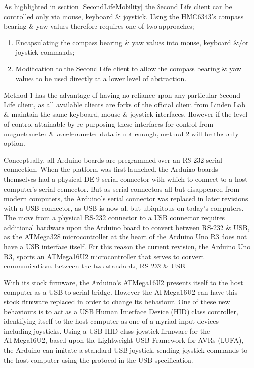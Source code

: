 As highlighted in section \ref{SecondLifeMobility} the Second Life client can be controlled only via mouse, keyboard \& joystick. Using the HMC6343's compass bearing \& yaw values therefore requires one of two approaches;

\begin{enumerate}
	\item Encapsulating the compass bearing \& yaw values into mouse, keyboard \&/or joystick commands;
	\item Modification to the Second Life client to allow the compass bearing \& yaw values to be used directly at a lower level of abstraction.
\end{enumerate}

Method 1 has the advantage of having no reliance upon any particular Second Life client, as all available clients are forks of the official client from Linden Lab \& maintain the same keyboard, mouse \& joystick interfaces. However if the level of control attainable by re-purposing these interfaces for control from magnetometer \& accelerometer data is not enough, method 2 will be the only option.

Conceptually, all Arduino boards are programmed over an RS-232 serial connection. When the platform was first launched, the Arduino boards themselves had a physical DE-9 serial connector with which to connect to a host computer's serial connector. But as serial connectors all but disappeared from modern computers, the Arduino's serial connector was replaced in later revisions with a USB connector, as USB is now all but ubiquitous on today's computers. The move from a physical RS-232 connector to a USB connector requires additional hardware upon the Arduino board to convert between RS-232 \& USB, as the ATMega328\atmegaTFootnote{} microcontroller at the heart of the Arduino Uno R3 does not have a USB interface itself. For this reason the current revision, the Arduino Uno R3, sports an ATMega16U2\atmegaFootnote{} microcontroller that serves to convert communications between the two standards, RS-232 \& USB.

With its stock firmware, the Arduino's ATMega16U2 presents itself to the host computer as a USB-to-serial bridge. However the ATMega16U2 can have this stock firmware replaced in order to change its behaviour. One of these new behaviours is to act as a USB Human Interface Device (HID) class controller, identifying itself to the host computer as one of a myriad input devices - including joysticks. Using a USB HID class joystick firmware for the ATMega16U2\arduinousbhidFootnote{}, based upon the Lightweight USB Framework for AVRs (LUFA)\lufaFootnote{}, the Arduino can imitate a standard USB joystick, sending joystick commands to the host computer using the protocol in the USB specification.

